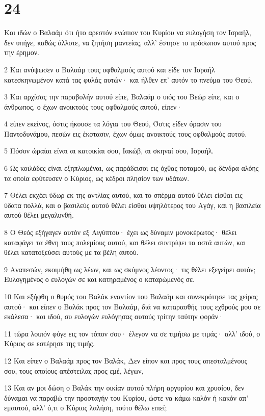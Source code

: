 \chapter{24}

\par Και ιδών ο Βαλαάμ ότι ήτο αρεστόν ενώπιον του Κυρίου να ευλογήση τον Ισραήλ, δεν υπήγε, καθώς άλλοτε, να ζητήση μαντείας, αλλ' έστησε το πρόσωπον αυτού προς την έρημον.
\par 2 Και ανύψωσεν ο Βαλαάμ τους οφθαλμούς αυτού και είδε τον Ισραήλ κατεσκηνωμένον κατά τας φυλάς αυτών· και ήλθεν επ' αυτόν το πνεύμα του Θεού.
\par 3 Και αρχίσας την παραβολήν αυτού είπε, Βαλαάμ ο υιός του Βεώρ είπε, και ο άνθρωπος, ο έχων ανοικτούς τους οφθαλμούς αυτού, είπεν·
\par 4 είπεν εκείνος, όστις ήκουσε τα λόγια του Θεού, Όστις είδεν όρασιν του Παντοδυνάμου, πεσών εις έκστασιν, έχων όμως ανοικτούς τους οφθαλμούς αυτού.
\par 5 Πόσον ώραίαι είναι αι κατοικίαι σου, Ιακώβ, αι σκηναί σου, Ισραήλ.
\par 6 Ως κοιλάδες είναι εξηπλωμέναι, ως παράδεισοι εις όχθας ποταμού, ως δένδρα αλόης τα οποία εφύτευσεν ο Κύριος, ως κέδροι πλησίον των υδάτων.
\par 7 Θέλει εκχέει ύδωρ εκ της αντλίας αυτού, και το σπέρμα αυτού θέλει είσθαι εις ύδατα πολλά, και ο βασιλεύς αυτού θέλει είσθαι υψηλότερος του Αγάγ, και η βασιλεία αυτού θέλει μεγαλυνθή.
\par 8 Ο Θεός εξήγαγεν αυτόν εξ Αιγύπτου· έχει ως δύναμιν μονοκέρωτος· θέλει καταφάγει τα έθνη τους πολεμίους αυτού, και θέλει συντρίψει τα οστά αυτών, και θέλει κατατοξεύσει αυτούς με τα βέλη αυτού.
\par 9 Αναπεσών, εκοιμήθη ως λέων, και ως σκύμνος λέοντος· τις θέλει εξεγείρει αυτόν; Ευλογημένος ο ευλογών σε και κατηραμένος ο καταρώμενός σε.
\par 10 Και εξήφθη ο θυμός του Βαλάκ εναντίον του Βαλαάμ και συνεκρότησε τας χείρας αυτού· και είπεν ο Βαλάκ προς τον Βαλαάμ, διά να καταρασθής τους εχθρούς μου σε εκάλεσα· και ιδού, συ ευλογών ευλόγησας αυτούς τρίτην ταύτην φοράν·
\par 11 τώρα λοιπόν φύγε εις τον τόπον σου· έλεγον να σε τιμήσω με τιμάς· αλλ' ιδού, ο Κύριος σε εστέρησε της τιμής.
\par 12 Και είπεν ο Βαλαάμ προς τον Βαλάκ, Δεν είπον και προς τους απεσταλμένους σου, τους οποίους απέστειλας προς εμέ, λέγων,
\par 13 Και αν μοι δώση ο Βαλάκ την οικίαν αυτού πλήρη αργυρίου και χρυσίου, δεν δύναμαι να παραβώ την προσταγήν του Κυρίου, ώστε να κάμω καλόν ή κακόν απ' εμαυτού, αλλ' ό,τι ο Κύριος λαλήση, τούτο θέλω ειπεί;
